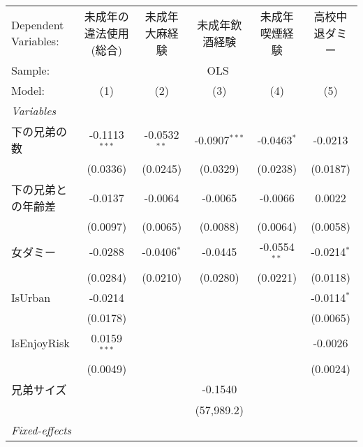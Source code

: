 \documentclass{article}
\begin{document}
\begin{landscape}


\begingroup
\centering
\begin{tabular}{lccccc}
   \tabularnewline \midrule \midrule
   Dependent Variables: & 未成年の違法使用(総合) & 未成年大麻経験 & 未成年飲酒経験  & 未成年喫煙経験 & 高校中退ダミー\\  
   Sample: & \multicolumn{5}{c}{OLS} \\ 
   Model:               & (1)                    & (2)            & (3)             & (4)            & (5)\\  
   \midrule
   \emph{Variables}\\
   下の兄弟の数         & -0.1113$^{***}$        & -0.0532$^{**}$ & -0.0907$^{***}$ & -0.0463$^{*}$  & -0.0213\\   
                        & (0.0336)               & (0.0245)       & (0.0329)        & (0.0238)       & (0.0187)\\   
   下の兄弟との年齢差   & -0.0137                & -0.0064        & -0.0065         & -0.0066        & 0.0022\\   
                        & (0.0097)               & (0.0065)       & (0.0088)        & (0.0064)       & (0.0058)\\   
   女ダミー             & -0.0288                & -0.0406$^{*}$  & -0.0445         & -0.0554$^{**}$ & -0.0214$^{*}$\\   
                        & (0.0284)               & (0.0210)       & (0.0280)        & (0.0221)       & (0.0118)\\   
   IsUrban              & -0.0214                &                &                 &                & -0.0114$^{*}$\\   
                        & (0.0178)               &                &                 &                & (0.0065)\\   
   IsEnjoyRisk          & 0.0159$^{***}$         &                &                 &                & -0.0026\\   
                        & (0.0049)               &                &                 &                & (0.0024)\\   
   兄弟サイズ           &                        &                & -0.1540         &                &   \\   
                        &                        &                & (57,989.2)      &                &   \\   
   \midrule
   \emph{Fixed-effects}\\

\end{tabular}
\end{landscape}
\end{document}
